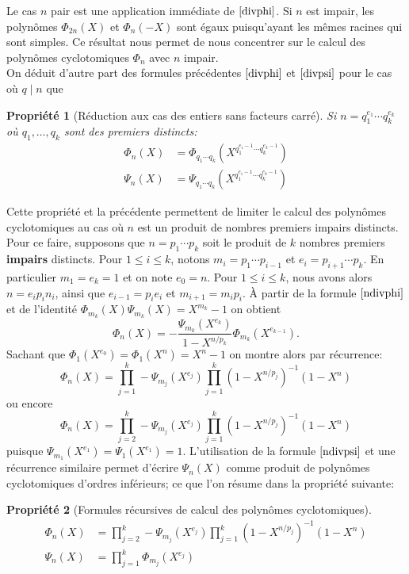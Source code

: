 \documentclass{article}
\theoremstyle{break}                  %
\newtheorem{propriete}{Propriété}
\begin{document}
Le cas $n$ pair est une application immédiate de $\ref{divphi}$. Si $n$ est impair, les polynômes $\Phi_{2n}(X)$ et $\Phi_{n}(-X)$ sont égaux puisqu'ayant les mêmes racines qui sont simples. Ce résultat nous permet de nous concentrer sur le calcul des polynômes cyclotomiques $\Phi_n$ avec $n$ impair.\\

On déduit d'autre part des formules précédentes $\ref{divphi}$ et $\ref{divpsi}$ pour le cas où $q \mid n$ que


\begin{propriete}[Réduction aux cas des entiers sans facteurs carré]
	Si $n = q_1^{e_1} \cdots q_k^{e_k}$ où $q_1, \dots, q_k$ sont des premiers distincts:
	\begin{align*}
		\Phi_{n}(X) &= \Phi_{q_1 \cdots q_k}(X^{q_1^{e_1 - 1} \cdots q_k^{e_k - 1}})\\
		\Psi_{n}(X) &= \Psi_{q_1 \cdots q_k}(X^{q_1^{e_1 - 1} \cdots q_k^{e_k - 1}})
	\end{align*}
\end{propriete}

Cette propriété et la précédente permettent de limiter le calcul des polynômes cyclotomiques au cas où $n$ est un produit de nombres premiers impairs distincts.\\


Pour ce faire, supposons que $n = p_1 \cdots p_k$ soit le produit de $k$ nombres premiers \textbf{impairs} distincts. Pour $1 \le i \le k$, notons $m_i = p_1 \cdots p_{i-1}$ et $e_i = p_{i+1} \cdots p_{k}$. En particulier $m_1=e_k=1$ et on note $e_0 = n$. Pour $1 \le i \le k$, nous avons alors $n = e_i p_i n_i$, ainsi que $e_{i-1}=p_i e_i$ et $m_{i+1}=m_i p_i$. À partir de la formule $\ref{ndivphi}$ et de l'identité $\Phi_{m_k}(X) \Psi_{m_k}(X) = X^{m_k}-1$ on obtient
$$\Phi_{n}(X) = - \frac{\Psi_{m_k}(X^{e_k})}{1- X^{n/p_k}} \Phi_{m_k}(X^{e_{k-1}}).$$
Sachant que $\Phi_1(X^{e_0}) = \Phi_1(X^n) = X^n-1$ on montre alors par récurrence:
$$\Phi_n(X)=\prod_{j=1}^{k} - \Psi_{m_j}(X^{e_j}) \prod_{j=1}^{k} (1-X^{n/p_j})^{-1}(1-X^n)$$
ou encore $$\Phi_n(X)=\prod_{j=2}^{k} - \Psi_{m_j}(X^{e_j}) \prod_{j=1}^{k} (1-X^{n/p_j})^{-1}(1-X^n)$$
puisque $\Psi_{m_1}(X^{e_1}) = \Psi_{1}(X^{e_1}) =1$. L'utilisation de la formule $\ref{ndivpsi}$ et une récurrence similaire permet d'écrire $\Psi_n(X)$ comme produit de polynômes cyclotomiques d'ordres inférieurs; ce que l'on résume dans la propriété suivante:


\begin{propriete}[Formules récursives de calcul des polynômes cyclotomiques]
	\begin{align*}
		\Phi_n(X) &=\prod_{j=2}^{k} - \Psi_{m_j}(X^{e_j}) \prod_{j=1}^{k} (1-X^{n/p_j})^{-1}(1-X^n)\tag{3.17}\label{recurphi}\\
		\Psi_{n}(X) &=\prod_{j=1}^{k} \Phi_{m_j}(X^{e_j})\tag{3.25}\label{recurpsi}
	\end{align*}
\end{propriete}
\end{document}
